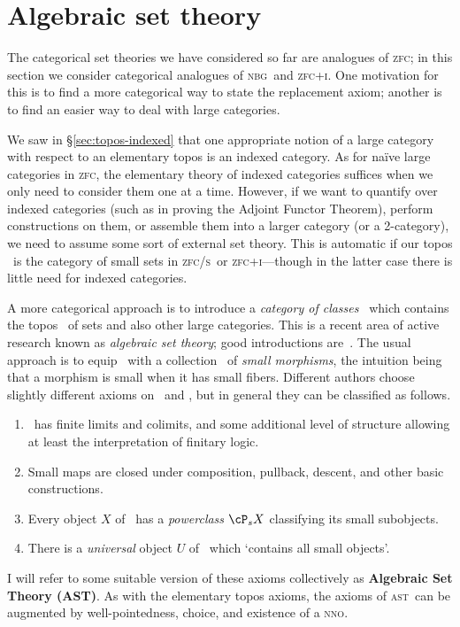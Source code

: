 \documentclass{amsart}
\def\zfc{\textsc{zfc}}
\def\zfci{\textsc{zfc+i}}
\def\zfcs{\textsc{zfc/s}}
\def\nbg{\textsc{nbg}}
\def\nno{\textsc{nno}}
\def\ast{\textsc{ast}}
\begin{document}
\section{Algebraic set theory}
\label{sec:ast}

The categorical set theories we have considered so far are analogues
of \zfc; in this section we consider categorical analogues of \nbg\
and \zfci.  One motivation for this is to find a more categorical way
to state the replacement axiom; another is to find an easier way to
deal with large categories.

We saw in \S\ref{sec:topos-indexed} that one appropriate notion of a
large category with respect to an elementary topos is an indexed
category.  As for na\"ive large categories in \zfc, the elementary
theory of indexed categories suffices when we only need to consider
them one at a time.  However, if we want to quantify over indexed
categories (such as in proving the Adjoint Functor Theorem), perform
constructions on them, or assemble them into a larger category (or a
2-category), we need to assume some sort of external set theory.  This
is automatic if our topos \bS\ is the category of small sets in \zfcs\
or \zfci---though in the latter case there is little need for indexed
categories.

A more categorical approach is to introduce a \emph{category of
  classes} \bC\ which contains the topos \bS\ of sets and also other
large categories.  This is a recent area of active research known as
\emph{algebraic set theory}; good introductions
are~\cite{awodey:outl-ast,jm:ast}.  The usual approach is to equip
\bC\ with a collection \cS\ of \emph{small morphisms}, the intuition
being that a morphism is small when it has small fibers.  Different
authors choose slightly different axioms on \bC\ and \cS, but in
general they can be classified as follows.
\begin{enumerate}
\item \bC\ has finite limits and colimits, and some additional level
  of structure allowing at least the interpretation of finitary logic.
\item Small maps are closed under composition, pullback, descent, and
  other basic constructions.
\item Every object $X$ of \bC\ has a \emph{powerclass} $\cP_s X$
  classifying its small subobjects.
\item There is a \emph{universal} object $U$ of \bC\ which `contains
  all small objects'.
\end{enumerate}
I will refer to some suitable version of these axioms collectively as
\textbf{Algebraic Set Theory (AST)}.  As with the elementary topos
axioms, the axioms of \ast\ can be augmented by well-pointedness,
choice, and existence of a \nno.
\end{document}
